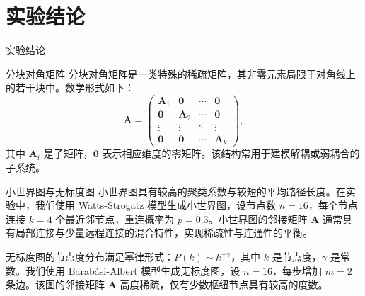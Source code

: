 \documentclass[presentation,aspectratio=169]{ctexbeamer}
\begin{document}
\section{实验结论}

\begin{frame}
\Huge{\centerline{\textcolor{covblue}{实验结论}}}
\end{frame}

\begin{frame}{分块对角矩阵}
分块对角矩阵是一类特殊的稀疏矩阵，其非零元素局限于对角线上的若干块中。数学形式如下：
\[
\mathbf{A} = \begin{pmatrix}
\mathbf{A}_1 & \mathbf{0} & \cdots & \mathbf{0} \\
\mathbf{0} & \mathbf{A}_2 & \cdots & \mathbf{0} \\
\vdots & \vdots & \ddots & \vdots \\
\mathbf{0} & \mathbf{0} & \cdots & \mathbf{A}_k
\end{pmatrix},
\]
其中 \(\mathbf{A}_i\) 是子矩阵，\(\mathbf{0}\) 表示相应维度的零矩阵。该结构常用于建模解耦或弱耦合的子系统。
\end{frame}


\begin{frame}{小世界图与无标度图}
小世界图具有较高的聚类系数与较短的平均路径长度。在实验中，我们使用 Watts-Strogatz 模型生成小世界图，设节点数 \(n = 16\)，每个节点连接 \(k = 4\) 个最近邻节点，重连概率为 \(p = 0.3\)。小世界图的邻接矩阵 \(\mathbf{A}\) 通常具有局部连接与少量远程连接的混合特性，实现稀疏性与连通性的平衡。
\vspace{8pt}
\pause

无标度图的节点度分布满足幂律形式：\(P(k) \sim k^{-\gamma}\)，其中 \(k\) 是节点度，\(\gamma\) 是常数。我们使用 Barabási-Albert 模型生成无标度图，设 \(n = 16\)，每步增加 \(m = 2\) 条边。该图的邻接矩阵 \(\mathbf{A}\) 高度稀疏，仅有少数枢纽节点具有较高的度数。
\end{frame}
\end{document}
